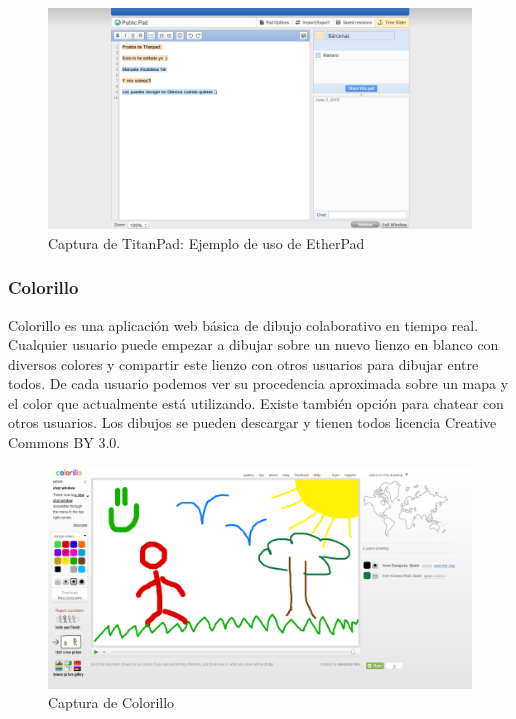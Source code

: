 	\begin{figure}[H]
		\centering
			\includegraphics[keepaspectratio, scale=0.30]{Media/Captures/titanpadWeb.png}
		\caption{Captura de TitanPad: Ejemplo de uso de EtherPad}
		\label{fig:titanpad}
	\end{figure} 	
	
	\subsubsection{Colorillo}
	
	Colorillo \cite{ref:colorillo} es una aplicación web básica de dibujo colaborativo en tiempo real. Cualquier usuario puede empezar a dibujar sobre un nuevo lienzo en blanco con diversos colores y compartir este lienzo con otros usuarios para dibujar entre todos. De cada usuario podemos ver su procedencia aproximada sobre un mapa y el color que actualmente está utilizando. Existe también opción para chatear con otros usuarios. Los dibujos se pueden descargar y tienen todos licencia Creative Commons BY 3.0.
	
	\begin{figure}[H]
		\centering
			\includegraphics[keepaspectratio, scale=0.30]{Media/Captures/colorilloWeb.png}
		\caption{Captura de Colorillo}
		\label{fig:colorillo}
	\end{figure}  	
	
